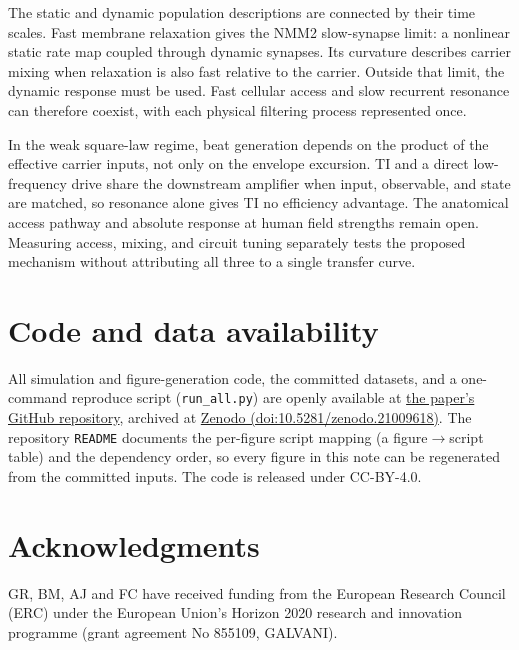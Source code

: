 \documentclass[11pt,a4paper]{article}
\newif\ifjne
\begin{document}
The static and dynamic population descriptions are connected by their time scales.
Fast membrane relaxation gives the NMM2 slow-synapse limit: a nonlinear static rate
map coupled through dynamic synapses. Its curvature describes carrier mixing when
relaxation is also fast relative to the carrier. Outside that limit, the dynamic
response must be used. Fast cellular access and slow recurrent resonance can
therefore coexist, with each physical filtering process represented once.

In the weak square-law regime, beat generation depends on the product of the
effective carrier inputs, not only on the envelope excursion. TI and a direct
low-frequency drive share the downstream amplifier when input, observable, and
state are matched, so resonance alone gives TI no efficiency advantage. The
anatomical access pathway and absolute response at human field strengths remain
open. Measuring access, mixing, and circuit tuning separately tests the proposed
mechanism without attributing all three to a single transfer curve.

\section*{Code and data availability}
All simulation and figure-generation code, the committed datasets, and a one-command
reproduce script (\texttt{run\_all.py}) are openly available at
\href{https://github.com/giulioruffini/TI-demodulation-paper}{the paper's GitHub repository}, archived at
\href{https://doi.org/10.5281/zenodo.21009618}{Zenodo (doi:10.5281/zenodo.21009618)}.
The repository \texttt{README} documents the per-figure script mapping (a
figure$\rightarrow$script table) and the dependency order, so every figure in this note can
be regenerated from the committed inputs. The code is released under CC-BY-4.0.

\section*{Acknowledgments}
GR, BM, AJ and FC have received funding from the European Research Council (ERC) under the
European Union's Horizon 2020 research and innovation programme (grant agreement No 855109,
GALVANI).

\ifjne
\end{document}
